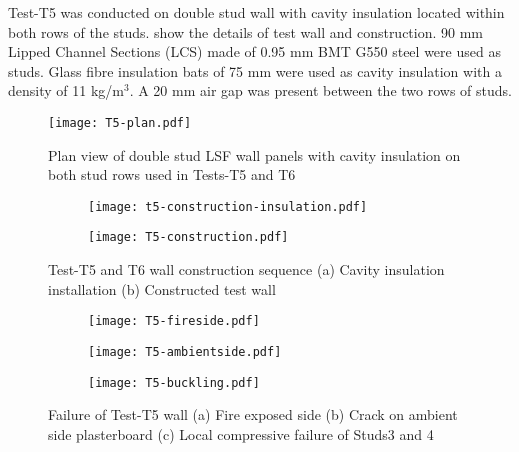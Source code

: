 Test-T5 was conducted on double stud wall with cavity insulation located within both rows of the studs.  show the details of test wall and construction. 90 mm Lipped Channel Sections (LCS) made of 0.95 mm BMT G550 steel were used as studs. Glass fibre insulation bats of 75 mm were used as cavity insulation with a density of 11 kg/m\(^3\). A 20 mm air gap was present between the two rows of studs.
\begin{figure}[htbp]
	\centering
		\texttt{[image: T5-plan.pdf]}
		\caption{Plan view of double stud LSF wall panels with cavity insulation on both stud rows used in Tests-T5 and T6}
		\label{fig:T5-plan}
\end{figure} 
\begin{figure}[!htbp]
	\centering
	\begin{subfigure}[b]{0.7\textwidth}
		\centering
		\texttt{[image: t5-construction-insulation.pdf]}
		\caption{}
		\label{subfig:t5-construction-insulation}
	\end{subfigure}
	\begin{subfigure}[b]{0.7\textwidth}
		\centering
		\texttt{[image: T5-construction.pdf]}
		\caption{}
		\label{subfig:T5-construction}
	\end{subfigure}
	   \caption{Test-T5 and T6 wall construction sequence (a) Cavity insulation installation (b) Constructed test wall}
	   \label{fig:t5-construction-sequence}
\end{figure}
\begin{figure}[!htbp]
	\centering
	\begin{subfigure}[b]{0.4\textwidth}
		\centering
		\texttt{[image: T5-fireside.pdf]}
		\caption{}
		\label{subfig:T5-fireside}
	\end{subfigure}
	\begin{subfigure}[b]{0.4\textwidth}
		\centering
		\texttt{[image: T5-ambientside.pdf]}
		\caption{}
		\label{subfig:T5-ambientside}
	\end{subfigure}
	\begin{subfigure}[b]{0.4\textwidth}
		\centering
		\texttt{[image: T5-buckling.pdf]}
		\caption{}
		\label{subfig:T5-buckling}
	\end{subfigure}
	   \caption{Failure of Test-T5 wall (a) Fire exposed side (b) Crack on ambient side plasterboard (c) Local compressive failure of Studs3 and 4}
	   \label{fig:T5-failure}
\end{figure}

